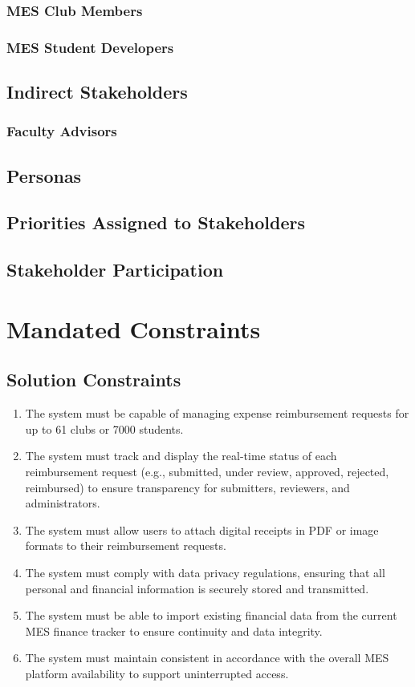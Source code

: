 \documentclass[12pt]{article}
\begin{document}
    \subsubsection{MES Club Members}
    \subsubsection{MES Student Developers}

  \subsection{Indirect Stakeholders}
    \subsubsection{Faculty Advisors}

  \subsection{Personas}
  \subsection{Priorities Assigned to Stakeholders}
  \subsection{Stakeholder Participation}


\section{Mandated Constraints}


\subsection{Solution Constraints}
  \begin{enumerate}
    \item The system must be capable of managing expense reimbursement requests for up to 61 clubs or 7000 students.
    \item The system must track and display the real-time status of each reimbursement request (e.g., submitted, under review, approved, rejected, reimbursed) to ensure transparency for submitters, reviewers, and administrators.
    \item The system must allow users to attach digital receipts in PDF or image formats to their reimbursement requests.
    \item The system must comply with data privacy regulations, ensuring that all personal and financial information is securely stored and transmitted.
    \item The system must be able to import existing financial data from the current MES finance tracker to ensure continuity and data integrity.
    \item The system must maintain consistent in accordance with the overall MES platform availability to support uninterrupted access.
  \end{enumerate}
\end{document}
